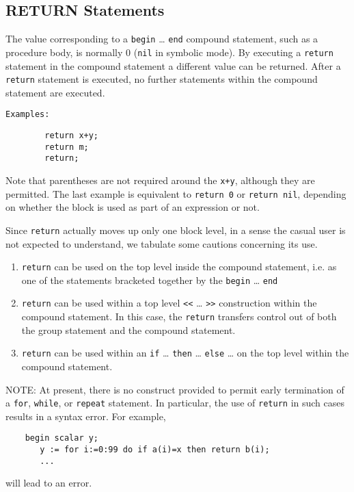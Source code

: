 \subsection{RETURN Statements}
\hypertarget{command:RETURN}{}

The value corresponding to a \texttt{begin} \ldots{} \texttt{end} compound
statement,
 such as a procedure body, is normally 0
(\texttt{nil} in symbolic mode).  By executing a \texttt{return}
statement in the compound statement a different value can be returned.
After a \texttt{return} statement is executed, no further statements within
the compound statement are executed.

\texttt{Examples:}
\begin{verbatim}
        return x+y;
        return m;
        return;
\end{verbatim}
Note that parentheses are not required around the \texttt{x+y}, although they
are permitted.  The last example is equivalent to \texttt{return 0} or
\texttt{return nil}, depending on whether the block is used as part of an
expression or not.

Since \texttt{return} actually moves up only one
block level, in a sense the casual user is not expected to
understand, we tabulate some cautions concerning its use.
\begin{enumerate}
\item \texttt{return} can be used on the top level inside the compound
statement, i.e. as one of the statements bracketed together by the
\texttt{begin} \ldots{} \texttt{end}

\item \texttt{return} can be used within a top level \texttt{<}\texttt{<}
  \ldots{} \texttt{>}\texttt{>} construction within the compound statement. In
  this case, the \texttt{return} transfers control out of both the
  group statement and the compound statement.

\item \texttt{return} can be used within an \texttt{if} \ldots{}
  \texttt{then} \ldots{} \texttt{else} \ldots{} on the top level within
  the compound statement.
\end{enumerate}
NOTE:  At present, there is no construct provided to permit early
termination of a \texttt{for}, \texttt{while},
or \texttt{repeat} statement.  In particular, the use of
\texttt{return} in such cases results in a syntax error.  For example,
\begin{verbatim}
    begin scalar y;
       y := for i:=0:99 do if a(i)=x then return b(i);
       ...
\end{verbatim}
will lead to an error.
